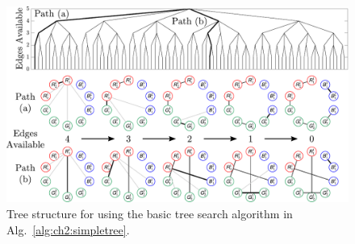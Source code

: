 \begin{figure}
\centering
\includegraphics[width=\columnwidth]{../ch2/figures/tree1simple_optimized}
\caption[Tree structure for  using the basic tree search algorithm]{Tree structure for  using the basic tree search algorithm in Alg.~\ref{alg:ch2:simpletree}.\label{fig:ch2:tree1simple}}
\end{figure}